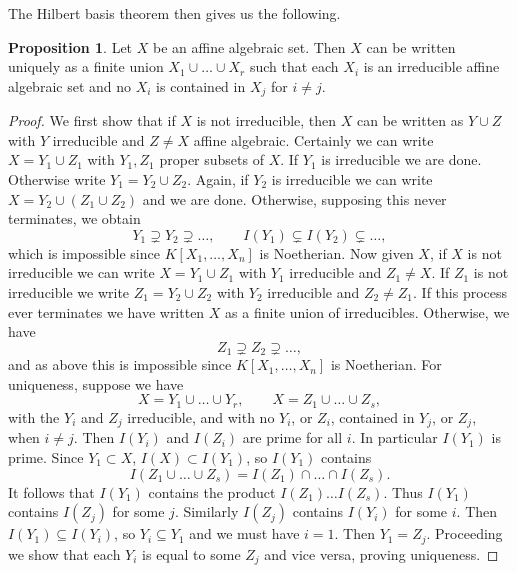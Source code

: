 \documentclass{article}
\newcommand{\rb}[1]{\left( #1 \right)}
\renewcommand{\sb}[1]{\left[ #1 \right]}
\theoremstyle{definition}\newtheorem{definition}{Definition}[subsection]
\theoremstyle{definition}\newtheorem{remark}[definition]{Remark}
\theoremstyle{definition}\newtheorem*{example}{Example}
\theoremstyle{definition}\newtheorem*{note}{Note}
\newtheorem{proposition}[definition]{Proposition}
\begin{document}
The Hilbert basis theorem then gives us the following.

\begin{proposition}
Let $ X $ be an affine algebraic set. Then $ X $ can be written uniquely as a finite union $ X_1 \cup \dots \cup X_r $ such that each $ X_i $ is an irreducible affine algebraic set and no $ X_i $ is contained in $ X_j $ for $ i \ne j $.
\end{proposition}

\begin{proof}
We first show that if $ X $ is not irreducible, then $ X $ can be written as $ Y \cup Z $ with $ Y $ irreducible and $ Z \ne X $ affine algebraic. Certainly we can write $ X = Y_1 \cup Z_1 $ with $ Y_1, Z_1 $ proper subsets of $ X $. If $ Y_1 $ is irreducible we are done. Otherwise write $ Y_1 = Y_2 \cup Z_2 $. Again, if $ Y_2 $ is irreducible we can write $ X = Y_2 \cup \rb{Z_1 \cup Z_2} $ and we are done. Otherwise, supposing this never terminates, we obtain
$$ Y_1 \supsetneq Y_2 \supsetneq \dots, \qquad I\rb{Y_1} \subsetneq I\rb{Y_2} \subsetneq \dots, $$
which is impossible since $ K\sb{X_1, \dots, X_n} $ is Noetherian. Now given $ X $, if $ X $ is not irreducible we can write $ X = Y_1 \cup Z_1 $ with $ Y_1 $ irreducible and $ Z_1 \ne X $. If $ Z_1 $ is not irreducible we write $ Z_1 = Y_2 \cup Z_2 $ with $ Y_2 $ irreducible and $ Z_2 \ne Z_1 $. If this process ever terminates we have written $ X $ as a finite union of irreducibles. Otherwise, we have
$$ Z_1 \supsetneq Z_2 \supsetneq \dots, $$
and as above this is impossible since $ K\sb{X_1, \dots, X_n} $ is Noetherian. For uniqueness, suppose we have
$$ X = Y_1 \cup \dots \cup Y_r, \qquad X = Z_1 \cup \dots \cup Z_s, $$
with the $ Y_i $ and $ Z_j $ irreducible, and with no $ Y_i $, or $ Z_i $, contained in $ Y_j $, or $ Z_j $, when $ i \ne j $. Then $ I\rb{Y_i} $ and $ I\rb{Z_i} $ are prime for all $ i $. In particular $ I\rb{Y_1} $ is prime. Since $ Y_1 \subset X $, $ I\rb{X} \subset I\rb{Y_1} $, so $ I\rb{Y_1} $ contains
$$ I\rb{Z_1 \cup \dots \cup Z_s} = I\rb{Z_1} \cap \dots \cap I\rb{Z_s}. $$
It follows that $ I\rb{Y_1} $ contains the product $ I\rb{Z_1} \dots I\rb{Z_s} $. Thus $ I\rb{Y_1} $ contains $ I\rb{Z_j} $ for some $ j $. Similarly $ I\rb{Z_j} $ contains $ I\rb{Y_i} $ for some $ i $. Then $ I\rb{Y_1} \subseteq I\rb{Y_i} $, so $ Y_i \subseteq Y_1 $ and we must have $ i = 1 $. Then $ Y_1 = Z_j $. Proceeding we show that each $ Y_i $ is equal to some $ Z_j $ and vice versa, proving uniqueness.
\end{proof}
\end{document}
